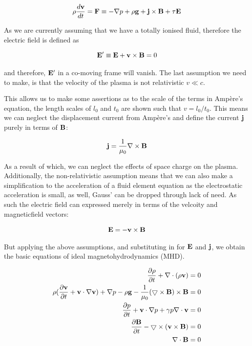 \begin{equation}
	\rho \frac{d \mathbf{v}}{d t } = \mathbf{F} \equiv -\nabla p + \rho\mathbf{g} + \mathbf{j} \times \mathbf{B + \tau\mathbf{E}} 
\end{equation}

As we are currently assuming that we have a totally ionised fluid, therefore the electric field is defined as

\begin{equation}
	\mathbf{E}' \equiv \mathbf{E} + \mathbf{v} \times \mathbf{B} = 0
\end{equation}

and therefore, $\mathbf{E}'$ in a co-moving frame will vanish.
The last assumption we need to make, is that the velocity of the plasma is not relativistic $v \ll c$.

This allows us to make some assertions as to the scale of the terms in Amp{\`e}re's equation, the length scales of $l_0$ and $t_0$ are shown such that $v = l_0/t_0$.
This means we can neglect the displacement current from Amp{\`e}re's and define the current $\mathbf{j}$ purely in terms of $\mathbf{B}$:

\begin{equation}
	\mathbf{j} = \frac{1}{\mu_0}\nabla \times \mathbf{B}
\end{equation}

As a result of which, we can neglect the effects of space charge on the plasma.
Additionally, the non-relativistic assumption means that we can also make a simplification to the acceleration of a fluid element equation as the electrostatic acceleration is small, as well, Gauss' can be dropped through lack of need.
As such the electric field can expressed merely in terms of the velcoity and magneticfield vectors:

\begin{equation}
	\mathbf{E} = -\mathbf{v} \times \mathbf{B}
\end{equation}

But applying the above assumptions, and substituting in for $\mathbf{E}$ and $\mathbf{j}$, we obtain the basic equations of ideal magnetohydrodynamics (MHD).

\begin{align}
	\frac{\partial \rho}{\partial t } + \nabla\cdot(\rho\mathbf{v}) &= 0 \\
	\rho(\frac{\partial \mathbf{v}}{\partial t } + \mathbf{v}\cdot\nabla\mathbf{v}) + \nabla p - \rho\mathbf{g} - \frac{1}{\mu_0}(\bigtriangledown \times \mathbf{B}) \times \mathbf{B} &= 0\\
	\frac{\partial p}{\partial t } + \mathbf{v}\cdot\nabla p + \gamma p\nabla\cdot\mathbf{v} &= 0\\
	\frac{\partial \mathbf{B}}{\partial t } - \bigtriangledown \times (\mathbf{v} \times \mathbf{B}) &= 0\\
	\nabla\cdot\mathbf{B} &= 0
\end{align}

